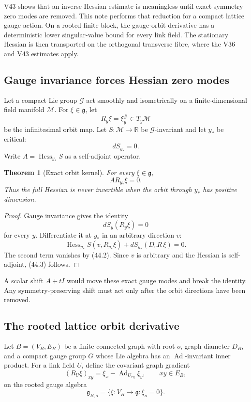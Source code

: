 \documentclass[11pt]{article}
\newtheorem{theorem}{Theorem}[section]
\begin{document}
V43 shows that an inverse-Hessian estimate is meaningless until exact
symmetry zero modes are removed.  This note performs that reduction for
a compact lattice gauge action.  On a rooted finite block, the
gauge-orbit derivative has a deterministic lower singular-value bound
for every link field.  The stationary Hessian is then transported on
the orthogonal transverse fibre, where the V36 and V43 estimates apply.

\subsection{Gauge invariance forces Hessian zero modes}

Let a compact Lie group \(\mathcal G\) act smoothly and isometrically on
a finite-dimensional field manifold \(\mathcal M\).  For
\(\xi\in\mathfrak g\), let
\[
 R_y\xi=\xi^\#_y\in T_y\mathcal M
 \tag{44.1}
\]
be the infinitesimal orbit map.  Let \(S:\mathcal M\to\mathbb R\) be
\(\mathcal G\)-invariant and let \(y_*\) be critical:
\[
 dS_{y_*}=0.
 \tag{44.2}
\]
Write \(A=\operatorname{Hess}_{y_*}S\) as a self-adjoint operator.

\begin{theorem}[Exact orbit kernel]
\label{thm:v11v44-orbit-kernel}
For every \(\xi\in\mathfrak g\),
\[
 A R_{y_*}\xi=0.
 \tag{44.3}
\]
Thus the full Hessian is never invertible when the orbit through
\(y_*\) has positive dimension.
\end{theorem}

\begin{proof}
Gauge invariance gives the identity
\[
 dS_y(R_y\xi)=0
 \tag{44.4}
\]
for every \(y\).  Differentiate it at \(y_*\) in an arbitrary direction
\(v\):
\[
 \operatorname{Hess}_{y_*}S(v,R_{y_*}\xi)
 +dS_{y_*}(D_vR\,\xi)=0.
\]
The second term vanishes by (44.2).  Since \(v\) is arbitrary and the
Hessian is self-adjoint, (44.3) follows.
\end{proof}

A scalar shift \(A+tI\) would move these exact gauge modes and break the
identity.  Any symmetry-preserving shift must act only after the orbit
directions have been removed.

\subsection{The rooted lattice orbit derivative}

Let \(B=(V_B,E_B)\) be a finite connected graph with root \(o\), graph
diameter \(D_B\), and a compact gauge group \(G\) whose Lie algebra has
an \(\operatorname{Ad}\)-invariant inner product.  For a link field
\(U\), define the covariant graph gradient
\[
 (R_U\xi)_{xy}
 =
 \xi_x-\operatorname{Ad}_{U_{xy}}\xi_y,
 \qquad xy\in E_B,
 \tag{44.5}
\]
on the rooted gauge algebra
\[
 \mathfrak g_{B,o}
 =
 \{\xi:V_B\to\mathfrak g:\xi_o=0\}.
 \tag{44.6}
\]
\end{document}
